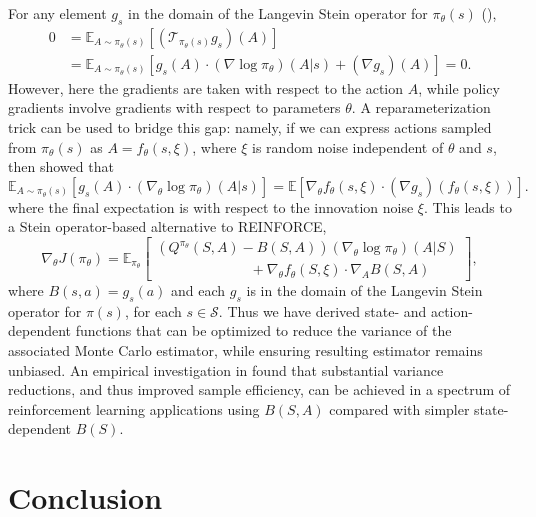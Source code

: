 \documentclass[12pt,paper=letter]{scrreprt}
\begin{document}
For any element $g_s$ in the domain of the Langevin Stein operator for $\pi_\theta(s)$ (),
\begin{align*}
0 & = \mathbb{E}_{A \sim \pi_\theta(s)}[(\mathcal{T}_{\pi_\theta(s)} g_s)(A)] \\
& = \mathbb{E}_{A \sim \pi_\theta(s)} \left[ g_s(A) \cdot (\nabla \log \pi_\theta)(A|s) + (\nabla g_s)(A) \right] = 0 .
\end{align*}
However, here the gradients are taken with respect to the action $A$, while policy gradients involve gradients with respect to parameters $\theta$. 
A reparameterization trick can be used to bridge this gap: namely, if we can express actions sampled from $\pi_\theta(s)$ as $A = f_\theta(s, \xi)$, where $\xi$ is random noise independent of $\theta$ and $s$, then \citet[Theorem 3.1 of][]{liu2018action} showed that
$$
\mathbb{E}_{A \sim \pi_\theta(s)} \left[ g_s(A) \cdot (\nabla_\theta \log \pi_\theta)(A|s)  \right]
= \mathbb{E} \left[ \nabla_\theta f_\theta(s, \xi) \cdot (\nabla g_s)(f_\theta(s, \xi)) \right].
$$
where the final expectation is with respect to the innovation noise $\xi$.
This leads to a Stein operator-based alternative to REINFORCE,
$$
\nabla_\theta J(\pi_\theta) = \mathbb{E}_{\pi_\theta} \left[ \begin{array}{l} (Q^{\pi_\theta}(S,A) - B(S, A)) (\nabla_\theta \log \pi_\theta)(A|S) \\
\hspace{80pt} + \nabla_\theta f_\theta(S, \xi) \cdot \nabla_A B(S, A) \end{array} \right],
$$
where $B(s,a) = g_s(a)$ and each $g_s$ is in the domain of the Langevin Stein operator for $\pi(s)$, for each $s \in \mathcal{S}$.
Thus we have derived state- and action-dependent functions that can be optimized to reduce the variance of the associated Monte Carlo estimator, while ensuring resulting estimator remains unbiased.
An empirical investigation in \citet{liu2018action} found that substantial variance reductions, and thus improved sample efficiency, can be achieved in a spectrum of reinforcement learning applications using $B(S,A)$ compared with simpler state-dependent $B(S)$.














\chapter{Conclusion}
\end{document}

